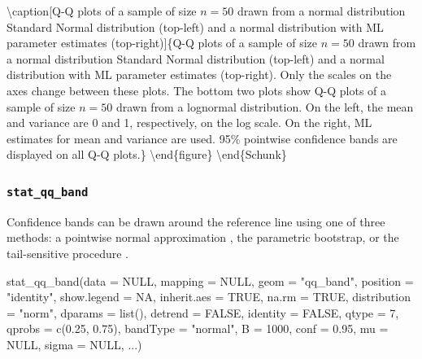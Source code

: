 \textbackslash{}caption{[}Q-Q plots of a sample of size \(n=50\) drawn
from a normal distribution Standard Normal distribution (top-left) and a
normal distribution with ML parameter estimates (top-right){]}\{Q-Q
plots of a sample of size \(n=50\) drawn from a normal distribution
Standard Normal distribution (top-left) and a normal distribution with
ML parameter estimates (top-right). Only the scales on the axes change
between these plots. The bottom two plots show Q-Q plots of a sample of
size \(n=50\) drawn from a lognormal distribution. On the left, the mean
and variance are 0 and 1, respectively, on the log scale. On the right,
ML estimates for mean and variance are used. 95\% pointwise confidence
bands are displayed on all Q-Q plots.\}\label{fig:qqline}
\textbackslash{}end\{figure\} \textbackslash{}end\{Schunk\}

\subsubsection{\texorpdfstring{\texttt{stat\_qq\_band}}{stat\_qq\_band}}\label{stat_qq_band}

Confidence bands can be drawn around the reference line using one of
three methods: a pointwise normal approximation \citep{Davison:1997},
the parametric bootstrap, or the tail-sensitive procedure
\citep{Aldor-Noiman2013-xw}.

\begin{Schunk}
\begin{Sinput}
stat_qq_band(data = NULL,
             mapping = NULL,
             geom = "qq_band",
             position = "identity",
             show.legend = NA,
             inherit.aes = TRUE,
             na.rm = TRUE,
             distribution = "norm",
             dparams = list(),
             detrend = FALSE,
             identity = FALSE,
             qtype = 7,
             qprobs = c(0.25, 0.75),
             bandType = "normal",
             B = 1000,
             conf = 0.95,
             mu = NULL,
             sigma = NULL,
             ...)
\end{Sinput}
\end{Schunk}

